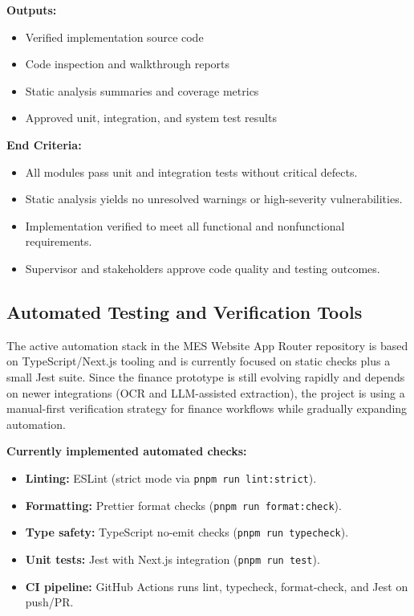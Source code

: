 \documentclass[12pt, titlepage]{article}
\begin{document}
\noindent\textbf{Outputs:}
\begin{itemize}
  \item Verified implementation source code
  \item Code inspection and walkthrough reports
  \item Static analysis summaries and coverage metrics
  \item Approved unit, integration, and system test results
\end{itemize}

\noindent\textbf{End Criteria:}
\begin{itemize}
  \item All modules pass unit and integration tests without critical defects.
  \item Static analysis yields no unresolved warnings or high-severity vulnerabilities.
  \item Implementation verified to meet all functional and nonfunctional requirements.
  \item Supervisor and stakeholders approve code quality and testing outcomes.
\end{itemize}


\subsection{Automated Testing and Verification Tools}

The active automation stack in the MES Website App Router repository is based on
TypeScript/Next.js tooling and is currently focused on static checks plus a
small Jest suite. Since the finance prototype is still evolving rapidly and
depends on newer integrations (OCR and LLM-assisted extraction), the project is
using a manual-first verification strategy for finance workflows while gradually
expanding automation.

\noindent\textbf{Currently implemented automated checks:}
\begin{itemize}
  \item \textbf{Linting:} ESLint (strict mode via \texttt{pnpm run lint:strict}).
  \item \textbf{Formatting:} Prettier format checks (\texttt{pnpm run format:check}).
  \item \textbf{Type safety:} TypeScript no-emit checks (\texttt{pnpm run typecheck}).
  \item \textbf{Unit tests:} Jest with Next.js integration (\texttt{pnpm run test}).
  \item \textbf{CI pipeline:} GitHub Actions runs lint, typecheck, format-check, and Jest on push/PR.
\end{itemize}
\end{document}
